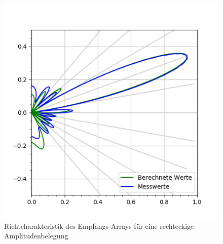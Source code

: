 \clearpage
\begin{figure}[htb]
\begin{minipage}{0.5\textwidth}
\includegraphics[width=\textwidth]{graphics/plot_test_characteristic_receiver_20_deg_send_rect_receive_rect_4_bursts.png}
\caption{Richtcharakteristik des Empfangs-Arrays für eine rechteckige Amplitudenbelegung} %
\label{fig:plot_test_characteristic_receiver_20_deg_send_rect_receive_rect_4_bursts}
%
\end{minipage}
\begin{minipage}{0.5\textwidth}

\end{minipage}
\end{figure}
